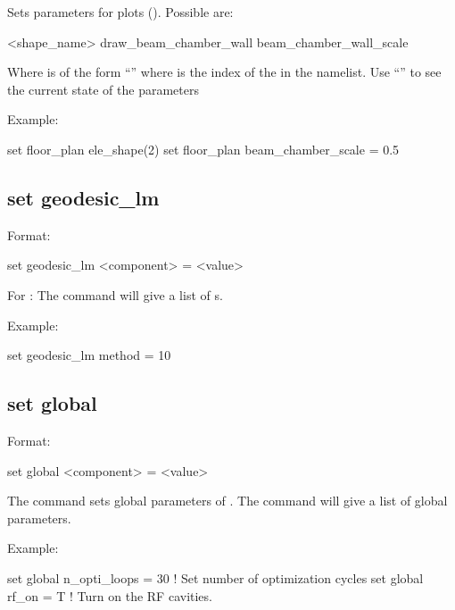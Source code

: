 {{Sets parameters for  plots ().  Possible
 are:
\begin{example}
  <shape_name>%
  draw_beam_chamber_wall
  beam_chamber_wall_scale
\end{example}
Where  is of the form ``'' where  is the index of
the  in the  namelist.  Use ``'' to
see the current state of the  parameters

Example:
\begin{example}
  set floor_plan ele_shape(2)%
  set floor_plan beam_chamber_scale = 0.5
\end{example}


\subsection{set geodesic_lm}
\label{s:set.geodesic.lm}

Format:
\begin{example}
  set geodesic_lm <component> = <value>
\end{example}

For : The  command will give a list of
s.

Example:
\begin{example}
  set geodesic_lm method = 10
\end{example}


\subsection{set global}
\label{s:set.global}

Format:
\begin{example}
  set global <component> = <value>
\end{example}

The  command sets global parameters of \tao.
The  command will give a list of global parameters.

Example:
\begin{example}
  set global n_opti_loops = 30  ! Set number of optimization cycles
  set global rf_on = T          ! Turn on the RF cavities.
\end{example}

}}

